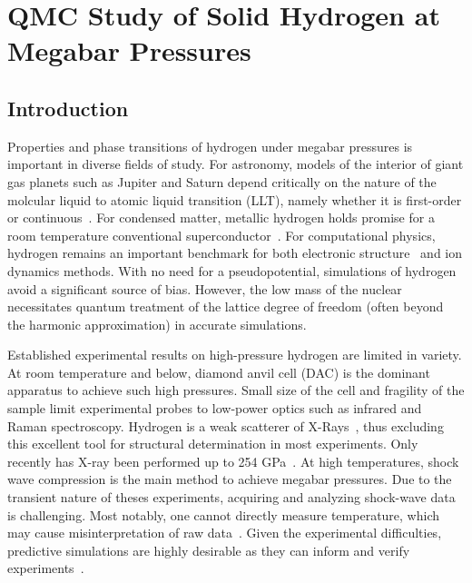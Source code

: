\chapter{QMC Study of Solid Hydrogen at Megabar Pressures}

\section{Introduction}

Properties and phase transitions of hydrogen under megabar pressures is important in diverse fields of study. For astronomy, models of the interior of giant gas planets such as Jupiter and Saturn depend critically on the nature of the molcular liquid to atomic liquid transition (LLT), namely whether it is first-order or continuous~\cite{Hubbard2016,Wahl2017}. For condensed matter, metallic hydrogen holds promise for a room temperature conventional superconductor~\cite{McMahon2011,McMahon2012}. For computational physics, hydrogen remains an important benchmark for both electronic structure~\cite{Motta2017} and ion dynamics methods. With no need for a pseudopotential, simulations of hydrogen avoid a significant source of bias. However, the low mass of the nuclear necessitates quantum treatment of the lattice degree of freedom (often beyond the harmonic approximation) in accurate simulations.

Established experimental results on high-pressure hydrogen are limited in variety. At room temperature and below, diamond anvil cell (DAC) is the dominant apparatus to achieve such high pressures. Small size of the cell and fragility of the sample limit experimental probes to low-power optics such as infrared and Raman spectroscopy\cite{RangaI.F.2017}. Hydrogen is a weak scatterer of X-Rays~\cite{Zha2014}, thus excluding this excellent tool for structural determination in most experiments. Only recently has X-ray been performed up to 254 GPa~\cite{Akahama2010,Ji2019}.
At high temperatures, shock wave compression is the main method to achieve megabar pressures. Due to the transient nature of theses experiments, acquiring and analyzing shock-wave data is challenging. Most notably, one cannot directly measure temperature, which may cause misinterpretation of raw data~\cite{Celliers2018,Knudson2004,Knudson2017}.
Given the experimental difficulties, predictive simulations are highly desirable as they can inform and verify experiments~\cite{Pierleoni2016b}.

